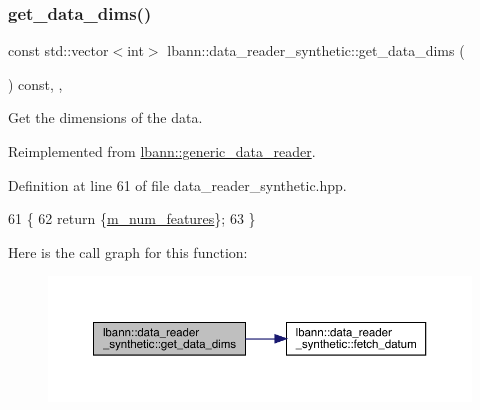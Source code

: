 \subsubsection{\texorpdfstring{get\+\_\+data\+\_\+dims()}{get\_data\_dims()}}
{\footnotesize\ttfamily const std\+::vector$<$int$>$ lbann\+::data\+\_\+reader\+\_\+synthetic\+::get\+\_\+data\+\_\+dims (\begin{DoxyParamCaption}{ }\end{DoxyParamCaption}) const\hspace{0.3cm}{\ttfamily [inline]}, {\ttfamily [override]}, {\ttfamily [virtual]}}



Get the dimensions of the data. 



Reimplemented from \hyperlink{classlbann_1_1generic__data__reader_ae06ff27459ac4a5d8ac14655d4b31318}{lbann\+::generic\+\_\+data\+\_\+reader}.



Definition at line 61 of file data\+\_\+reader\+\_\+synthetic.\+hpp.


\begin{DoxyCode}
61                                                       \{
62     \textcolor{keywordflow}{return} \{\hyperlink{classlbann_1_1data__reader__synthetic_a18f0ba6014a0f1edec24c7c3c109c520}{m\_num\_features}\};
63   \}
\end{DoxyCode}
Here is the call graph for this function\+:\nopagebreak
\begin{figure}[H]
\begin{center}
\leavevmode
\includegraphics[width=350pt]{classlbann_1_1data__reader__synthetic_a5ee6a8ee02a6ff788988ae427ccf4aa5_cgraph}
\end{center}
\end{figure}
\mbox{\label{classlbann_1_1data__reader__synthetic_a0eea15c5697e7e7dfd0abaccff3fc2c3}} 
